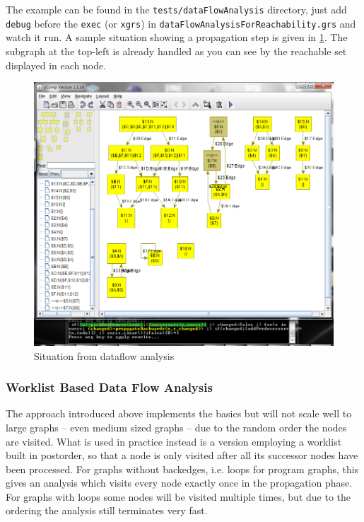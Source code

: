 The example can be found in the \texttt{tests/dataFlowAnalysis} directory, just add \texttt{debug} before the \texttt{exec} (or \texttt{xgrs}) in \texttt{dataFlowAnalysisForReachability.grs} and watch it run.
A sample situation showing a propagation step is given in \ref{figdataflow}.
The subgraph at the top-left is already handled as you can see by the reachable set displayed in each node.

\begin{figure}[htbp]
  \centering
  \includegraphics[width=\textwidth]{fig/Dataflow}
  \caption{Situation from dataflow analysis}
  \label{figdataflow}
\end{figure}

\subsubsection*{Worklist Based Data Flow Analysis}

The approach introduced above implements the basics but will not scale well to large graphs -- even medium sized graphs -- due to the random order the nodes are visited.
What is used in practice instead is a version employing a worklist built in postorder, so that a node is only visited after all its successor nodes have been processed.
For graphs without backedges, i.e. loops for program graphs, this gives an analysis which visits every node exactly once in the propagation phase.
For graphs with loops some nodes will be visited multiple times, but due to the ordering the analysis still terminates very fast.

